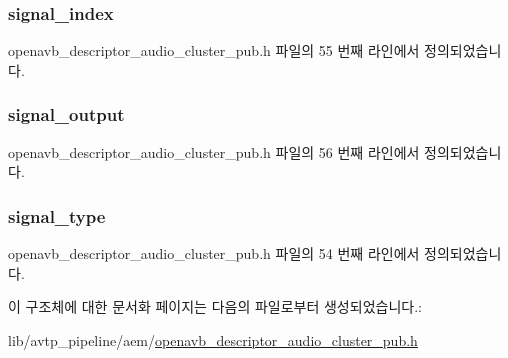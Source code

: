 \subsubsection[{\texorpdfstring{signal\+\_\+index}{signal_index}}]{ signal\+\_\+index}\hypertarget{structopenavb__aem__descriptor__audio__cluster__t_ad948e7e79bb182b81a76a51c3d6ee9ed}{}\label{structopenavb__aem__descriptor__audio__cluster__t_ad948e7e79bb182b81a76a51c3d6ee9ed}


openavb\+\_\+descriptor\+\_\+audio\+\_\+cluster\+\_\+pub.\+h 파일의 55 번째 라인에서 정의되었습니다.

\subsubsection[{\texorpdfstring{signal\+\_\+output}{signal_output}}]{ signal\+\_\+output}\hypertarget{structopenavb__aem__descriptor__audio__cluster__t_a6a464d21574d97691ea70c2037ff8f6f}{}\label{structopenavb__aem__descriptor__audio__cluster__t_a6a464d21574d97691ea70c2037ff8f6f}


openavb\+\_\+descriptor\+\_\+audio\+\_\+cluster\+\_\+pub.\+h 파일의 56 번째 라인에서 정의되었습니다.

\subsubsection[{\texorpdfstring{signal\+\_\+type}{signal_type}}]{ signal\+\_\+type}\hypertarget{structopenavb__aem__descriptor__audio__cluster__t_a51ba5fdff9933eb274b46b67185d1c7b}{}\label{structopenavb__aem__descriptor__audio__cluster__t_a51ba5fdff9933eb274b46b67185d1c7b}


openavb\+\_\+descriptor\+\_\+audio\+\_\+cluster\+\_\+pub.\+h 파일의 54 번째 라인에서 정의되었습니다.



이 구조체에 대한 문서화 페이지는 다음의 파일로부터 생성되었습니다.\+:\begin{DoxyCompactItemize}
\item 
lib/avtp\+\_\+pipeline/aem/\hyperlink{openavb__descriptor__audio__cluster__pub_8h}{openavb\+\_\+descriptor\+\_\+audio\+\_\+cluster\+\_\+pub.\+h}\end{DoxyCompactItemize}
